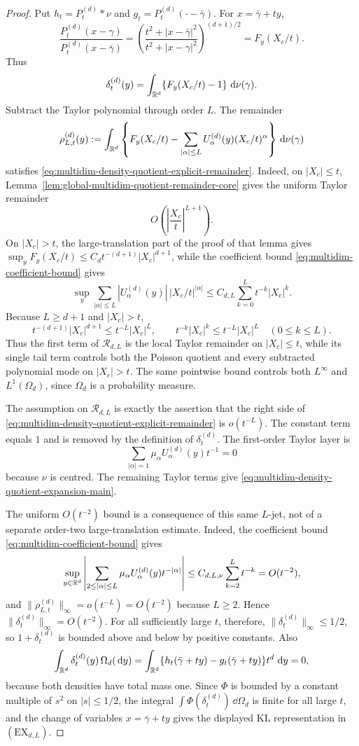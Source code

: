\begin{proof}
Put \(h_t=P_t^{(d)}*\nu\) and \(g_t=P_t^{(d)}(\cdot-\bar{\gamma})\).
For \(x=\bar{\gamma}+ty\),
\[
\frac{P_t^{(d)}(x-\gamma)}{P_t^{(d)}(x-\bar{\gamma})}
=
\left(\frac{t^2+|x-\bar{\gamma}|^2}{t^2+|x-\gamma|^2}\right)^{(d+1)/2}
=F_y(X_c/t).
\]
Thus
\[
\delta_t^{(d)}(y)=\int_{\mathbb{R}^d}\{F_y(X_c/t)-1\}\,\,\mathrm{d}\nu(\gamma).
\]
Subtract the Taylor polynomial through order \(L\).  The remainder
\[
\rho_{L,t}^{(d)}(y):=
\int_{\mathbb{R}^d}\left\{
F_y(X_c/t)-\sum_{|\alpha|\le L}U_\alpha^{(d)}(y)(X_c/t)^\alpha
\right\}\,\mathrm{d}\nu(\gamma)
\]
satisfies \eqref{eq:multidim-density-quotient-explicit-remainder}.  Indeed,
on \(|X_c|\le t\), Lemma~\ref{lem:global-multidim-quotient-remainder-core}
gives the uniform Taylor remainder
\[
O\!\left(\left|\frac{X_c}{t}\right|^{L+1}\right).
\]
On \(|X_c|>t\), the large-translation part of the proof of that lemma gives
\(\sup_yF_y(X_c/t)\le C_dt^{-(d+1)}|X_c|^{d+1}\), while the coefficient bound
\eqref{eq:multidim-coefficient-bound} gives
\[
\sup_y\sum_{|\alpha|\le L}
|U_\alpha^{(d)}(y)|\,|X_c/t|^{|\alpha|}
\le C_{d,L}\sum_{k=0}^{L}t^{-k}|X_c|^k .
\]
Because \(L\ge d+1\) and \(|X_c|>t\),
\[
t^{-(d+1)}|X_c|^{d+1}\le t^{-L}|X_c|^L,
\qquad
t^{-k}|X_c|^k\le t^{-L}|X_c|^L\quad(0\le k\le L).
\]
Thus the first term of \(\mathcal R_{d,L}\) is the local Taylor remainder on
\(|X_c|\le t\), while its single tail term controls both the Poisson quotient
and every subtracted polynomial mode on \(|X_c|>t\).  The same pointwise
bound controls both \(L^\infty\) and \(L^1(\Omega_d)\), since \(\Omega_d\) is a
probability measure.

The assumption on \(\mathcal R_{d,L}\) is exactly the assertion that the
right side of \eqref{eq:multidim-density-quotient-explicit-remainder} is
\(o(t^{-L})\).
The constant term equals \(1\) and is removed by the definition of
\(\delta_t^{(d)}\).  The first-order Taylor layer is
\[
\sum_{|\alpha|=1}\mu_\alpha U_\alpha^{(d)}(y)t^{-1}=0
\]
because \(\nu\) is centred.  The remaining Taylor terms give
\eqref{eq:multidim-density-quotient-expansion-main}.

The uniform \(O(t^{-2})\) bound is a consequence of this same \(L\)-jet, not
of a separate order-two large-translation estimate.  Indeed, the coefficient
bound \eqref{eq:multidim-coefficient-bound} gives
\[
\sup_{y\in\mathbb{R}^d}
\left|\sum_{2\le|\alpha|\le L}
\mu_\alpha U_\alpha^{(d)}(y)t^{-|\alpha|}\right|
\le C_{d,L,\nu}\sum_{k=2}^{L}t^{-k}
=O(t^{-2}),
\]
and \(\|\rho_{L,t}^{(d)}\|_\infty=o(t^{-L})=O(t^{-2})\) because \(L\ge2\).
Hence
\(\|\delta_t^{(d)}\|_\infty=O(t^{-2})\).
For all sufficiently large \(t\), therefore, \(\|\delta_t^{(d)}\|_\infty\le
1/2\), so \(1+\delta_t^{(d)}\) is bounded above and below by positive
constants.  Also
\[
\int_{\mathbb{R}^d}\delta_t^{(d)}(y)\,\Omega_d(\,\mathrm{d} y)
=\int_{\mathbb{R}^d}\{h_t(\bar{\gamma}+ty)-g_t(\bar{\gamma}+ty)\}t^d\,\,\mathrm{d} y=0,
\]
because both densities have total mass one.  Since \(\Phi\) is bounded by a
constant multiple of \(s^2\) on \(|s|\le1/2\), the integral
\(\int\Phi(\delta_t^{(d)})\,\dd\Omega_d\) is finite for all large \(t\), and
the change of variables \(x=\bar{\gamma}+ty\) gives the displayed KL
representation in \((\mathrm{EX}_{d,L})\).
\end{proof}

